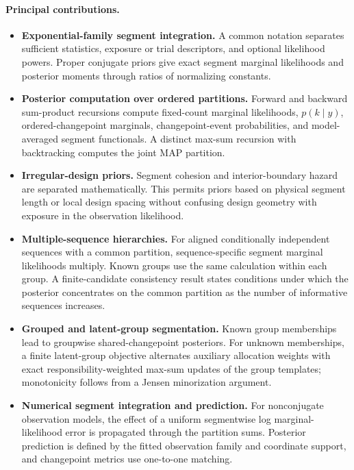 \paragraph{Principal contributions.}
\begin{itemize}
\item \textbf{Exponential-family segment integration.} A common notation separates sufficient
statistics, exposure or trial descriptors, and optional likelihood powers. Proper conjugate priors
give exact segment marginal likelihoods and posterior moments through ratios of normalizing
constants.

\item \textbf{Posterior computation over ordered partitions.} Forward and backward sum-product
recursions compute fixed-count marginal likelihoods, $p(k\mid y)$, ordered-changepoint marginals,
changepoint-event probabilities, and model-averaged segment functionals. A distinct max-sum
recursion with backtracking computes the joint MAP partition.

\item \textbf{Irregular-design priors.} Segment cohesion and interior-boundary hazard are separated
mathematically. This permits priors based on physical segment length or local design spacing without
confusing design geometry with exposure in the observation likelihood.

\item \textbf{Multiple-sequence hierarchies.} For aligned conditionally independent sequences with
a common partition, sequence-specific segment marginal likelihoods multiply. Known groups use the
same calculation within each group. A finite-candidate consistency result states conditions under
which the posterior concentrates on the common partition as the number of informative sequences
increases.

\item \textbf{Grouped and latent-group segmentation.} Known group memberships lead to groupwise
shared-changepoint posteriors. For unknown memberships, a finite latent-group objective alternates
auxiliary allocation weights with exact responsibility-weighted max-sum updates of the group
templates; monotonicity follows from a Jensen minorization argument.

\item \textbf{Numerical segment integration and prediction.} For nonconjugate observation models,
the effect of a uniform segmentwise log marginal-likelihood error is propagated through the
partition sums. Posterior prediction is defined by the fitted observation family and coordinate
support, and changepoint metrics use one-to-one matching.
\end{itemize}

